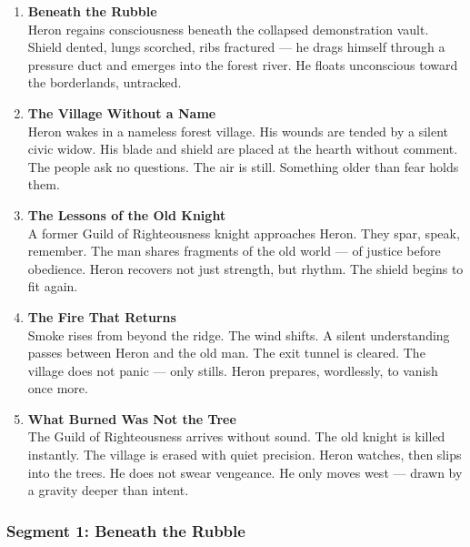 \documentclass[9pt]{article}
\begin{document}
\begin{center}
\begin{enumerate}
    \item \textbf{Beneath the Rubble} \\
    Heron regains consciousness beneath the collapsed demonstration vault. Shield dented, lungs scorched, ribs fractured — he drags himself through a pressure duct and emerges into the forest river. He floats unconscious toward the borderlands, untracked.

    \vspace{.3in}
    \item \textbf{The Village Without a Name} \\
    Heron wakes in a nameless forest village. His wounds are tended by a silent civic widow. His blade and shield are placed at the hearth without comment. The people ask no questions. The air is still. Something older than fear holds them.

    \vspace{.3in}
    \item \textbf{The Lessons of the Old Knight} \\
    A former Guild of Righteousness knight approaches Heron. They spar, speak, remember. The man shares fragments of the old world — of justice before obedience. Heron recovers not just strength, but rhythm. The shield begins to fit again.

    \vspace{.3in}
    \item \textbf{The Fire That Returns} \\
    Smoke rises from beyond the ridge. The wind shifts. A silent understanding passes between Heron and the old man. The exit tunnel is cleared. The village does not panic — only stills. Heron prepares, wordlessly, to vanish once more.

    \vspace{.3in}
    \item \textbf{What Burned Was Not the Tree} \\
    The Guild of Righteousness arrives without sound. The old knight is killed instantly. The village is erased with quiet precision. Heron watches, then slips into the trees. He does not swear vengeance. He only moves west — drawn by a gravity deeper than intent.
\end{enumerate}
\end{center}

\newpage

\subsubsection*{Segment 1: Beneath the Rubble}
\end{document}
